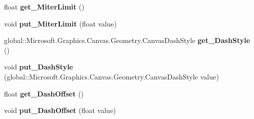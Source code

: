 \begin{DoxyCompactItemize}
\item 
\mbox{\label{interface_microsoft_1_1_graphics_1_1_canvas_1_1_geometry_1_1_i_canvas_stroke_style_a75a67b6c8e374ada2860deffb62fd790}} 
float {\bfseries get\+\_\+\+Miter\+Limit} ()
\item 
\mbox{\label{interface_microsoft_1_1_graphics_1_1_canvas_1_1_geometry_1_1_i_canvas_stroke_style_a8cae4d32f3a346d5bc506c2e5c172343}} 
void {\bfseries put\+\_\+\+Miter\+Limit} (float value)
\item 
\mbox{\label{interface_microsoft_1_1_graphics_1_1_canvas_1_1_geometry_1_1_i_canvas_stroke_style_a4e200c8b211b9a0372f10cfc99f37f85}} 
global\+::\+Microsoft.\+Graphics.\+Canvas.\+Geometry.\+Canvas\+Dash\+Style {\bfseries get\+\_\+\+Dash\+Style} ()
\item 
\mbox{\label{interface_microsoft_1_1_graphics_1_1_canvas_1_1_geometry_1_1_i_canvas_stroke_style_a3a3866d0af05bea0d5111d39bad2f7aa}} 
void {\bfseries put\+\_\+\+Dash\+Style} (global\+::\+Microsoft.\+Graphics.\+Canvas.\+Geometry.\+Canvas\+Dash\+Style value)
\item 
\mbox{\label{interface_microsoft_1_1_graphics_1_1_canvas_1_1_geometry_1_1_i_canvas_stroke_style_a261cdb6c0132a1ce93c7ecd652c1956d}} 
float {\bfseries get\+\_\+\+Dash\+Offset} ()
\item 
\mbox{\label{interface_microsoft_1_1_graphics_1_1_canvas_1_1_geometry_1_1_i_canvas_stroke_style_a470c5f115b6bf096380d61e538a59cad}} 
void {\bfseries put\+\_\+\+Dash\+Offset} (float value)
\item 
\mbox{\label{interface_microsoft_1_1_graphics_1_1_canvas_1_1_geometry_1_1_i_canvas_stroke_style_a01ec98472128934fc496593cee96dff2}} 

\end{DoxyCompactItemize}
